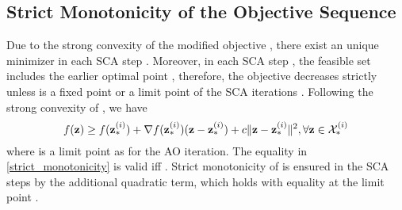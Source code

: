 \subsection{Strict Monotonicity of the Objective Sequence} \label{c-e}
Due to the strong convexity of the modified objective , there exist an unique minimizer in each \ac{SCA} step . Moreover, in each \ac{SCA} step , the feasible set  includes the earlier optimal point , therefore, the objective decreases strictly unless  is a fixed point or a limit point of the \ac{SCA} iterations \cite{marks1978technical}. Following the strong convexity of , we have
\begin{equation} \label{strict_monotonicity}
f(\mbf{z}) \geq f(\mbf{z}_{\ast}^{(i)}) + \nabla f(\mbf{z}_{\ast}^{(i)}) (\mbf{z} - \mbf{z}_{\ast}^{(i)}) + c \|\mbf{z} - \mbf{z}_{\ast}^{(i)}\|^2, \forall \mbf{z}\in \mc{X}^{(i)}_\ast
\end{equation}
where  is a limit point as  for the  \ac{AO} iteration. The equality in \eqref{strict_monotonicity} is valid iff . Strict monotonicity of  is ensured in the \ac{SCA} steps by the additional quadratic term, which holds with equality at the limit point .

